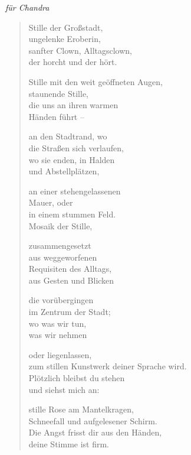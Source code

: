 
\cleartorecto


\hspace{2em}\emph{für Chandra}

\begin{verse}

Stille der Großstadt,\\
ungelenke Eroberin,\\
sanfter Clown, Alltagsclown,\\
der horcht und der hört.

Stille mit den weit geöffneten Augen,\\
staunende Stille,\\
die uns an ihren warmen\\
Händen führt --

an den Stadtrand, wo\\
die Straßen sich verlaufen,\\
wo sie enden, in Halden\\
und Abstellplätzen,

an einer stehengelassenen\\
Mauer, oder\\
in einem stummen Feld.\\
Mosaik der Stille,

zusammengesetzt\\
aus weggeworfenen\\
Requisiten des Alltags,\\
aus Gesten und Blicken

die vorübergingen\\
im Zentrum der Stadt;\\
wo was wir tun,\\
was wir nehmen

oder liegenlassen,\\
zum stillen Kunstwerk deiner Sprache wird.\\
Plötzlich bleibst du stehen\\
und siehst mich an:

stille Rose am Mantelkragen,\\
Schneefall und aufgelesener Schirm.\\
Die Angst frisst dir aus den Händen,\\
deine Stimme ist firm.

\end{verse}

\cleartoverso


